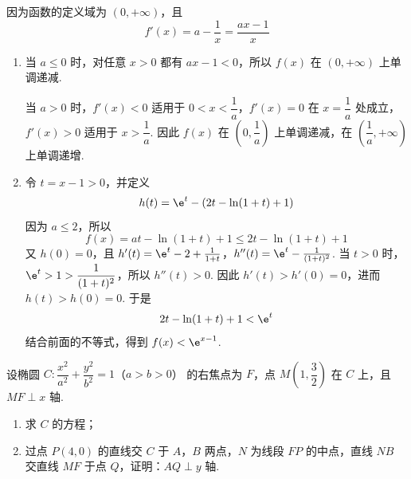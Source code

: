 \begin{solution}
因为函数的定义域为 \((0,+\infty)\)，且
\[
f'(x)=a-\frac1x=\frac{ax-1}{x}
\]
\begin{enumerate}
\item 当 \(a\le0\) 时，对任意 \(x>0\) 都有 \(ax-1<0\)，所以 \(f(x)\) 在 \((0,+\infty)\) 上单调递减.

当 \(a>0\) 时，\(f'(x)<0\) 适用于 \(0<x<\dfrac1a\)，\(f'(x)=0\) 在 \(x=\dfrac1a\) 处成立，\(f'(x)>0\) 适用于 \(x>\dfrac1a\). 因此 \(f(x)\) 在 \(\left(0,\dfrac1a\right)\) 上单调递减，在 \(\left(\dfrac1a,+\infty\right)\) 上单调递增.
\item 令 \(t=x-1>0\)，并定义
\[
h(t)=\e^t-\left(2t-\ln(1+t)+1\right)
\]
因为 \(a\le2\)，所以
\[
f(x)=at-\ln(1+t)+1\le2t-\ln(1+t)+1
\]
又 \(h(0)=0\)，且
\(h'(t)=\e^t-2+\frac1{1+t}\)，\(h''(t)=\e^t-\frac1{(1+t)^2}\).
当 \(t>0\) 时，\(\e^t>1>\dfrac1{(1+t)^2}\)，所以 \(h''(t)>0\). 因此 \(h'(t)>h'(0)=0\)，进而 \(h(t)>h(0)=0\). 于是
\[
2t-\ln(1+t)+1<\e^t
\]
结合前面的不等式，得到 \(f(x)<\e^{x-1}\).
\end{enumerate}
\end{solution}

\begin{problem}
设椭圆 \(C:\dfrac{x^2}{a^2}+\dfrac{y^2}{b^2}=1\)（\(a>b>0\)） 的右焦点为 \(F\)，点 \(M\left(1,\dfrac32\right)\) 在 \(C\) 上，且 \(MF\perp x\) 轴.
\begin{enumerate}
\item 求 \(C\) 的方程；
\item 过点 \(P(4,0)\) 的直线交 \(C\) 于 \(A\)，\(B\) 两点，\(N\) 为线段 \(FP\) 的中点，直线 \(NB\) 交直线 \(MF\) 于点 \(Q\)，证明：\(AQ\perp y\) 轴.
\end{enumerate}
\end{problem}

